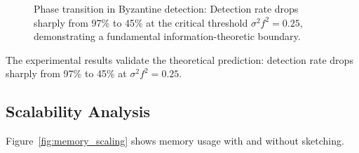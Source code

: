 \documentclass[runningheads]{llncs}
\begin{document}
\begin{figure}[htbp]
\caption{Phase transition in Byzantine detection: Detection rate drops sharply from 97\% to 45\% at the critical threshold $\sigma^2 f^2 = 0.25$, demonstrating a fundamental information-theoretic boundary.}
\label{fig:phase_transition}
\end{figure}

The experimental results validate the theoretical prediction: detection rate drops sharply from 97\% to 45\% at $\sigma^2 f^2 = 0.25$.

\subsection{Scalability Analysis}

Figure~\ref{fig:memory_scaling} shows memory usage with and without sketching.
\end{document}
